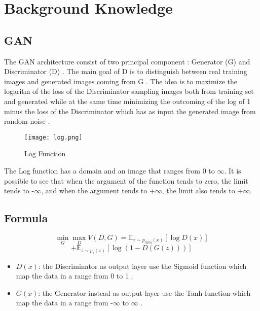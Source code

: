 
\section*{Background Knowledge}

\subsection*{
    GAN
}
The GAN architecture consist of two principal component :
Generator (G) and Discriminator (D) .
The main goal of D is to distinguish between real training images and generated images coming 
from G .
The idea is to maximize the logaritm of the loss of the Discriminator sampling images both from training set and 
generated while at the same time minimizing the outcoming of the log of 1 minus the loss of the Discriminator which has 
as input the generated image from random noise .


\begin{figure}[h!]
\texttt{[image: log.png]}
\caption{Log Function}
\end{figure}
The Log function has a domain and an image that ranges from 0 to $\infty$.
It is possible to see that when the argument of the function tends to zero, the limit tends to -$\infty$, 
and when the argument tends to +$\infty$, the limit also tends to +$\infty$.

\subsection*{Formula}
\begin{equation}
    \min_{G} \max_{D} V(D, G) = \mathbb{E}_{x \sim p_{\text{data}}(x)}[\log D(x)] 
\end{equation}
\[
+ \mathbb{E}_{z \sim p_z(z)}[\log(1 - D(G(z)))]
\]
\begin{itemize}
    \item $D(x)$: the Discriminator as output layer use the Sigmoid function which map the data in a
    range from 0 to 1 .
    \item $G(x)$: the Generator instead as output layer use the Tanh function which map the data in a
    range from -$\infty$ to $\infty$ .
\end{itemize}


